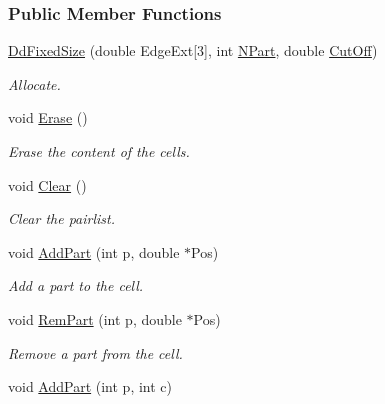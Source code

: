 \subsubsection*{Public Member Functions}
\begin{DoxyCompactItemize}
\item 
\hyperlink{classDdFixedSize_a3b9cc956e6f916c8eb675870cf403b3a}{Dd\+Fixed\+Size} (double Edge\+Ext\mbox{[}3\mbox{]}, int \hyperlink{classDomDecBasics_abdcc792391d8c5092471dff191de47f4}{N\+Part}, double \hyperlink{classDomDecBasics_af2411aba2dd63fa22b1bc279653ff7a0}{Cut\+Off})
\begin{DoxyCompactList}\small\item\em Allocate. \end{DoxyCompactList}\item 
void \hyperlink{classDdFixedSize_a98ae2e78109ea826eea71da14c37ce95}{Erase} ()
\begin{DoxyCompactList}\small\item\em Erase the content of the cells. \end{DoxyCompactList}\item 
void \hyperlink{classDdFixedSize_aa71d36872f416feaa853788a7a7a7ef8}{Clear} ()\hypertarget{classDdFixedSize_aa71d36872f416feaa853788a7a7a7ef8}{}\label{classDdFixedSize_aa71d36872f416feaa853788a7a7a7ef8}

\begin{DoxyCompactList}\small\item\em Clear the pairlist. \end{DoxyCompactList}\item 
void \hyperlink{classDdFixedSize_a16bd930c99f12ce47277234de23650ca}{Add\+Part} (int p, double $\ast$Pos)\hypertarget{classDdFixedSize_a16bd930c99f12ce47277234de23650ca}{}\label{classDdFixedSize_a16bd930c99f12ce47277234de23650ca}

\begin{DoxyCompactList}\small\item\em Add a part to the cell. \end{DoxyCompactList}\item 
void \hyperlink{classDdFixedSize_aa81dd095eb9134882b33685338bec68c}{Rem\+Part} (int p, double $\ast$Pos)\hypertarget{classDdFixedSize_aa81dd095eb9134882b33685338bec68c}{}\label{classDdFixedSize_aa81dd095eb9134882b33685338bec68c}

\begin{DoxyCompactList}\small\item\em Remove a part from the cell. \end{DoxyCompactList}\item 
void \hyperlink{classDdFixedSize_a9e2dba5688a67c185c133e7191e596b3}{Add\+Part} (int p, int c)\hypertarget{classDdFixedSize_a9e2dba5688a67c185c133e7191e596b3}{}\label{classDdFixedSize_a9e2dba5688a67c185c133e7191e596b3}


\end{DoxyCompactItemize}
